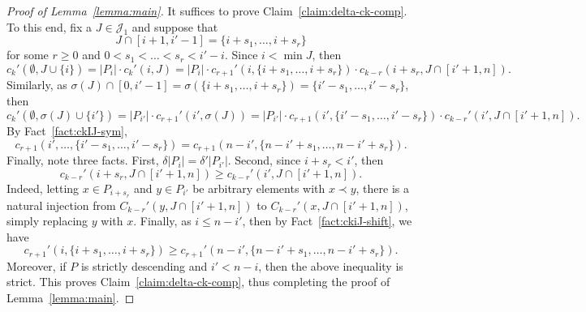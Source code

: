 \documentclass[11pt,a4paper,reqno]{amsart}
\numberwithin{claim}{thm}
\theoremstyle{definition}
\newcommand{\cJ}{\mathcal{J}}
\renewcommand{\le}{\leqslant}
\renewcommand{\ge}{\geqslant}
\begin{document}
\begin{proof}[{Proof of Lemma~\ref{lemma:main}}]
  It suffices to prove Claim~\ref{claim:delta-ck-comp}. To this end, fix a $J \in \cJ_1$ and suppose that
  \[
    J \cap [i+1, i'-1] = \{i + s_1, \dotsc, i+s_r\}
  \]
  for some $r \ge 0$ and $0 < s_1 < \dotsc < s_r < i'-i$. Since $i < \min J$, then
  \[
    c_k'(\emptyset, J \cup \{i\}) = |P_i| \cdot c_k'(i, J) = |P_i| \cdot c_{r+1}'(i, \{i+s_1, \dotsc, i+s_r\}) \cdot c_{k-r}(i+s_r, J \cap [i'+1, n]).
  \]
  Similarly, as $\sigma(J) \cap [0, i'-1] = \sigma(\{i+s_1, \dotsc, i+s_r\}) = \{i'-s_1, \dotsc, i'-s_r\}$, then
  \[
    c_k'(\emptyset, \sigma(J) \cup \{i'\}) = |P_{i'}| \cdot c_{r+1}'(i', \sigma(J)) = |P_{i'}| \cdot c_{r+1}(i', \{i'-s_1, \dotsc, i'-s_r\}) \cdot c_{k-r}'(i', J \cap [i'+1, n]).
  \]
  By Fact~\ref{fact:ckIJ-sym},
  \[
    c_{r+1}(i', \dotsc, \{i'-s_1, \dotsc, i'-s_r\}) = c_{r+1}(n-i', \{n-i'+s_1, \dotsc, n-i'+s_r\}).
  \]
  Finally, note three facts. First, $\delta|P_i| = \delta'|P_{i'}|$. Second, since $i + s_r < i'$, then
  \[
    c_{k-r}'(i+s_r, J \cap [i'+1, n]) \ge c_{k-r}'(i', J \cap [i'+1, n]).
  \]
  Indeed, letting $x \in P_{i+s_r}$ and $y \in P_{i'}$ be arbitrary elements with $x \prec y$, there is a natural injection from $C_{k-r}'(y, J \cap [i'+1, n])$ to $C_{k-r}'(x, J \cap [i'+1, n])$, simply replacing $y$ with $x$. Finally, as $i \le n-i'$, then by Fact~\ref{fact:ckiJ-shift}, we have
  \[
    c_{r+1}'(i, \{i+s_1, \dotsc, i+s_r\}) \ge c_{r+1}'(n-i', \{n-i'+s_1, \dotsc, n-i'+s_r\}).
  \]
  Moreover, if $P$ is strictly descending and $i' < n-i$, then the above inequality is strict. This proves Claim~\ref{claim:delta-ck-comp}, thus completing the proof of Lemma~\ref{lemma:main}.
\end{proof}



\end{document}
